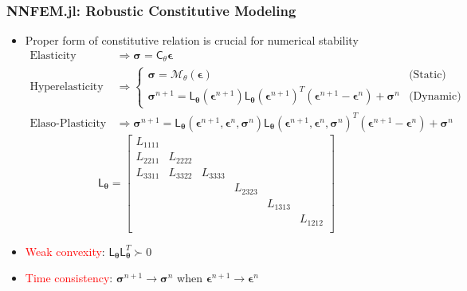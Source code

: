 \documentclass[usenames,dvipsnames]{beamer}
\newcommand{\ChoL}{\mathsf{L}}
\newcommand{\bt}[0]{\bm{\theta}}
\begin{document}
\begin{frame}
	\frametitle{NNFEM.jl: Robustic Constitutive Modeling}
	\begin{itemize}
\item Proper form of constitutive relation is crucial for numerical stability
{\footnotesize\begin{align*}
 \mbox{Elasticity} &\Rightarrow \bm\sigma = \mathsf{C}_{\theta}\bm\epsilon \\
\mbox{Hyperelasticity } &\Rightarrow \begin{cases}\bm\sigma =\mathcal{M}_{\theta}(\bm\epsilon) & \mbox{(Static)} \\
\bm{\sigma}^{n+1}  =  \ChoL_{\bt}(\bm\epsilon^{n+1}) \ChoL_{\bt}(\bm\epsilon^{n+1})^T (\bm{\epsilon}^{n+1} - \bm{\epsilon}^{n})  + \bm{\sigma}^{n}  & \mbox{(Dynamic)} \end{cases} \\
	\mbox{Elaso-Plasticity} &\Rightarrow \bm\sigma^{n+1} = \ChoL_{\bt}(\bm\epsilon^{n+1},\bm{\epsilon}^{n},\bm{\sigma}^{n}) \ChoL_{\bt}(\bm\epsilon^{n+1},\bm{\epsilon}^{n},\bm{\sigma}^{n})^T (\bm{\epsilon}^{n+1} - \bm{\epsilon}^{n})  + \bm{\sigma}^{n} 
\end{align*}
}{\footnotesize$$\ChoL_{\bt} = \begin{bmatrix}
L_{1111}  &  & &  &       &\\
L_{2211}  & L_{2222} & &   & &\\
 L_{3311}  &  L_{3322}               & L_{3333} &  & &\\
               &                 &                 & L_{2323}&  &\\
              &               &                  &                & L_{1313} &\\
              &                 &                  &                &                 &L_{1212}\\
\end{bmatrix}$$}
	\item \textcolor{red}{Weak convexity}: $\ChoL_{\bt}\ChoL_{\bt}^T \succ 0$
	\item \textcolor{red}{Time consistency}:  $\bm\sigma^{n+1} \rightarrow \bm \sigma^n$ when $\bm\epsilon^{n+1} \rightarrow \bm \epsilon^n$
\end{itemize}

\end{frame}
\end{document}

